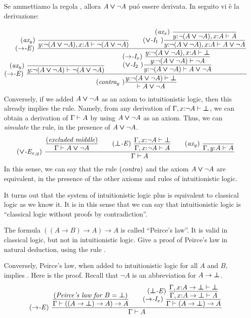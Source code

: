 \documentclass{article}
\begin{document}
Se ammettiamo la regola , allora $A\mathbin{\textrm{\rm\boldmath $\vee$}}\neg A$ pu\'o essere
derivata. In seguito vi \`e la derivazione:
{\footnotesize
\[ \trule{$\to$-E}\ \deriv{\raisebox{-6ex}{$\squishr{\trule{ax$_y$}~}\deriv{}{\typ{y}{\neg(A\cor\neg A)}\tj\neg(A\cor\neg A)}$}\hspace{-24ex}
  \squishr{\trule{$\to$-E}~}\deriv{\squishr{\trule{ax$_y$}~}\deriv{}{\typ{y}{\neg(A\cor\neg A)},\typ{x}{A}\tj\neg(A\cor\neg A)}
    \sep \trule{$\cor$-I$_1$~}\deriv{\squishr{\trule{ax$_x$}~}\deriv{}{\typ{y}{\neg(A\cor\neg A)},\typ{x}{A}\tj A}}{\typ{y}{\neg(A\cor\neg A)},\typ{x}{A}\tj A\cor\neg A}}{
   \trule{$\cor$-I$_2$~}\deriv{ 
  \squishr{\trule{$\to$-I$_x$}~}\deriv{\typ{y}{\neg(A\cor\neg A)},\typ{x}{A}\tj \cfalse}{\typ{y}{\neg(A\cor\neg A)}\tj \neg A}
  }{\typ{y}{\neg(A\cor\neg A)}\tj A\cor \neg A}\hspace{-18ex}
  }}{\trule{contra$_y$~}\deriv{\typ{y}{\neg(A\cor\neg A)}\tj\cfalse}{\tj A\cor\neg A}}
\]}
Conversely, if we added $A\mathbin{\textrm{\rm\boldmath $\vee$}}\neg A$ as an axiom to intuitionistic
logic, then this already implies the  rule. Namely, from
any derivation of $\Gamma,x{:}\neg A\vdash\textrm{\rm\boldmath $\bot$}$, we can obtain a
derivation of $\Gamma\vdash A$ by using $A\mathbin{\textrm{\rm\boldmath $\vee$}}\neg A$ as an axiom. Thus,
we can {\em simulate} the  rule, in the presence of
$A\mathbin{\textrm{\rm\boldmath $\vee$}}\neg A$.
\[ \trule{$\cor$-E$_{x,y}$}\ \deriv{\deriv{\trule{excluded middle}}{\Gamma\tj A\cor \neg A} \sep
 \trule{$\cfalse$-E}\ \deriv{ \Gamma,\typ{x}{\neg A}\tj\cfalse}{\Gamma,\typ{x}{\neg A}\tj A}
\sep \trule{ax$_y$}\ \deriv{}{\Gamma,\typ{y}{A}\tj A}}{\Gamma\tj A}
\]
In this sense, we can say that the rule $\textrm{(\textit{contra\/})}$ and the axiom
$A\mathbin{\textrm{\rm\boldmath $\vee$}}\neg A$ are equivalent, in the presence of the other axioms and
rules of intuitionistic logic.

It turns out that the system of intuitionistic logic plus
 is equivalent to classical logic as we know it. It is
in this sense that we can say that intuitionistic logic is ``classical
logic without proofs by contradiction''.

\begin{exercise}
  The formula $((A\to B)\to A)\to A$ is called ``Peirce's law''. It is
  valid in classical logic, but not in intuitionistic logic. Give a
  proof of Peirce's law in natural deduction, using the rule
  .
\end{exercise}

Conversely, Peirce's law, when added to intuitionistic logic for all
$A$ and $B$, implies . Here is the proof. Recall that
$\neg A$ is an abbreviation for $A\to\textrm{\rm\boldmath $\bot$}$.
\[ \trule{$\to$-E}~
   \deriv{
   \deriv{\trule{Peirce's law for $B=\cfalse$}}
         {\Gamma\tj((A\to\cfalse)\to A)\to A}
   \sep
   \trule{$\to$-I$_x$}~
   \deriv{
   \squishr{\trule{$\cfalse$-E}~}
   \deriv{\Gamma,\typ{x}{A\to\cfalse}\tj\cfalse}
         {\Gamma,\typ{x}{A\to\cfalse}\tj A}
   }
   {\Gamma\tj(A\to\cfalse)\to A}
   }
   {\Gamma\tj A}
\]
\end{document}
